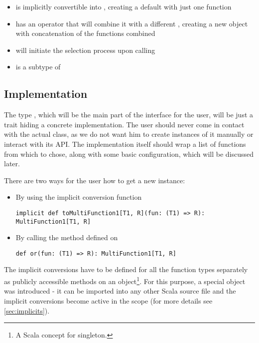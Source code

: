 \begin{itemize}
	\item {} is implicitly convertible into , creating a default with just one function
	\item {} has an operator  that will combine it with a different , creating a new object with concatenation of the functions combined
	\item {} will initiate the selection process upon calling 
	\item {} is a subtype of 
\end{itemize}

\subsection{Implementation}
\label{subsec:api_implementation}

The type , which will be the main part of the interface for the user, will be just a trait hiding a concrete implementation. The user should never come in contact with the actual class, as we do not want him to create instances of it manually or interact with its API. The implementation itself should wrap a list of functions from which to chose, along with some basic configuration, which will be discussed later.

There are two ways for the user how to get a new  instance:

\begin{itemize}
	\item By using the implicit conversion function
	\lstset{style=Scala}
	\begin{lstlisting}
implicit def toMultiFunction1[T1, R](fun: (T1) => R): MultiFunction1[T1, R]
\end{lstlisting}
	\item By calling the  method defined on 
		\lstset{style=Scala}
	\begin{lstlisting}
def or(fun: (T1) => R): MultiFunction1[T1, R]
	\end{lstlisting}
\end{itemize}

The implicit conversions have to be defined for all the function types separately as publicly accessible methods on an object\footnote{A Scala concept for singleton.}. For this purpose, a special object  was introduced - it can be imported into any other Scala source file and the implicit conversions become active in the scope (for more details see \ref{sec:implicits}).

